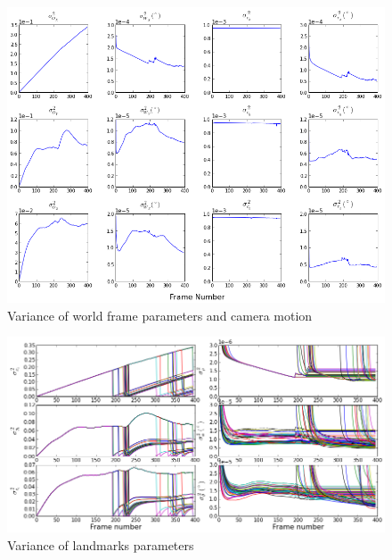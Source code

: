 \begin{figure}[h]
\centering
\includegraphics[width=14cm, keepaspectratio=true]
{./Figures/fltfig/cut1/Figure120.png}
\caption{Variance of world frame parameters and camera motion}
\label{fltfig:120}
\end{figure}


\begin{figure}[h]
\centering
\includegraphics[width=14cm, keepaspectratio=true]
{./Figures/fltfig/cut1/Figure40.png}
\caption{Variance of landmarks parameters}
\label{fltfig:3}
\end{figure}
\FloatBarrier

